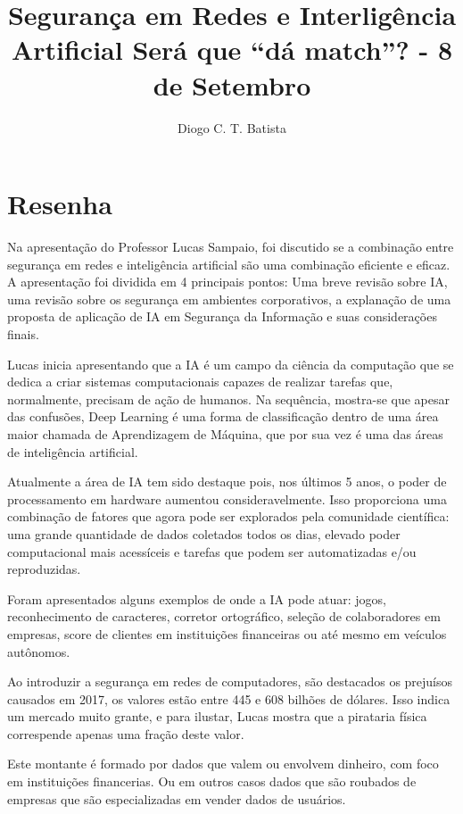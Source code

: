 \documentclass[12pt]{article}
\title{Segurança em Redes e Interligência Artificial Será que ``dá match''? - 8 de Setembro}
\author{Diogo C. T. Batista\inst{1}}
\begin{document}
\maketitle

\section{Resenha}

Na apresentação do Professor Lucas Sampaio, foi discutido se a combinação entre segurança em redes e inteligência artificial são uma combinação eficiente e eficaz. A apresentação foi dividida em 4 principais pontos: Uma breve revisão sobre IA, uma revisão sobre os segurança em ambientes corporativos, a explanação de uma proposta de aplicação de IA em Segurança da Informação e suas considerações finais.

Lucas inicia apresentando que a IA é um campo da ciência da computação que se dedica a criar sistemas computacionais capazes de realizar tarefas que, normalmente, precisam de ação de humanos. Na sequência, mostra-se que apesar das confusões, Deep Learning é uma forma de classificação dentro de uma área maior chamada de Aprendizagem de Máquina, que por sua vez é uma das áreas de inteligência artificial.

Atualmente a área de IA tem sido destaque pois, nos últimos 5 anos, o poder de processamento em hardware aumentou consideravelmente. Isso proporciona uma combinação de fatores que agora pode ser explorados pela comunidade científica: uma grande quantidade de dados coletados todos os dias, elevado poder computacional mais acessíceis e tarefas que podem ser automatizadas e/ou reproduzidas.

Foram apresentados alguns exemplos de onde a IA pode atuar: jogos, reconhecimento de caracteres, corretor ortográfico, seleção de colaboradores em empresas, score de clientes em instituições financeiras ou até mesmo em veículos autônomos.

Ao introduzir a segurança em redes de computadores, são destacados os prejuísos causados em 2017, os valores estão entre 445 e 608 bilhões de dólares. Isso indica um mercado muito grante, e para ilustar, Lucas mostra que a pirataria física correspende apenas uma fração deste valor.

Este montante é formado por dados que valem ou envolvem dinheiro, com foco em instituições financerias. Ou em outros casos dados que são roubados de empresas que são especializadas em vender dados de usuários.
\end{document}
